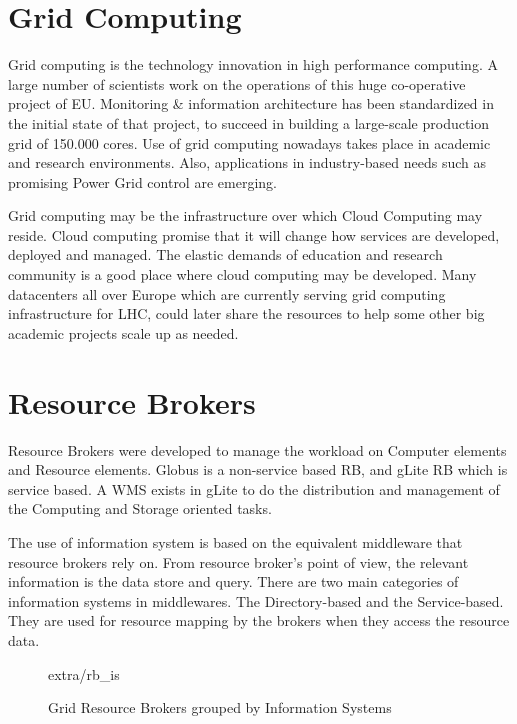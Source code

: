 
\section{Grid Computing}
Grid computing \cite{li2005grid} is the technology innovation in high performance computing. A large number of scientists work on the operations of this huge co-operative project of EU. Monitoring \& information architecture \cite{fisher2002datagrid} has been standardized in the initial state of that project, to succeed in building a large-scale production grid of 150.000 cores. Use of grid computing nowadays takes place in academic and research environments. Also, applications in industry-based needs such as promising Power Grid control \cite{Taylor2006} are emerging.

Grid computing may be the infrastructure over which Cloud Computing may reside. Cloud computing promise that it will change how services are developed, deployed and managed. The elastic demands of education and research community is a good place where cloud computing may be developed. Many datacenters all over Europe which are currently serving grid computing infrastructure for \ac{LHC}, could later share the resources to help some other big academic projects scale up as needed.

\section{Resource Brokers}
Resource Brokers \cite{Kertesz06ataxonomy} were developed to manage the workload on Computer elements and Resource elements. Globus is a non-service based RB, and gLite RB which is service based. A \ac{WMS} exists in gLite to do the distribution and management of the Computing and Storage oriented tasks.

The use of information system is based on the equivalent middleware that resource brokers rely on. From resource broker's point of view, the relevant information is the data store and query. There are two main categories of information systems in middlewares. The Directory-based and the Service-based. They are used for resource mapping by the brokers when they access the resource data.

\begin{figure}[h]
\begin{center}
 {extra/rb_is}
\caption{Grid Resource Brokers grouped by Information Systems\cite{Kertesz06ataxonomy}}
\end{center}
\end{figure}

